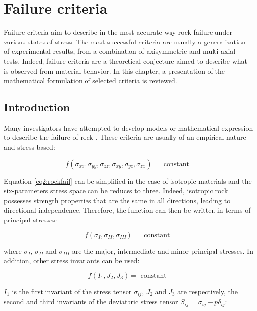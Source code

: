 \chapter{Failure criteria}\label{ch2:title}

Failure criteria aim to describe in the most accurate way rock failure under various states of stress. The most successful criteria are usually a generalization of experimental results, from a combination of axisymmetric and multi-axial tests. Indeed, failure criteria are a theoretical conjecture aimed to describe what is observed from material behavior. In this chapter, a presentation of the mathematical formulation of selected criteria is reviewed.

\section{Introduction}\label{ch2:background}

Many investigators have attempted to develop models or mathematical expression to describe the failure of rock \cite{Labuz2018}. These criteria are usually of an empirical nature and stress based: 

\begin{equation}\label{eq2:rockfail}
    f\left(\sigma_{x x}, \sigma_{y y}, \sigma_{z z}, \sigma_{x y}, \sigma_{y z}, \sigma_{z x}\right)=\text { constant }
\end{equation}

Equation \ref{eq2:rockfail} can be simplified in the case of isotropic materials and the six-parameters stress space can be reduces to three. Indeed, isotropic rock possesses strength properties that are the same in all directions, leading to directional independence. Therefore, the function can then be written in terms of principal stresses: 

\begin{equation}\label{eq2:fsigconst}
    f\left(\sigma_{I}, \sigma_{II}, \sigma_{III} \right)=\text { constant }
\end{equation}

where $\sigma_{I}$, $\sigma_{II}$ and $\sigma_{III}$ are the major, intermediate and minor principal stresses. In addition, other stress invariants can be used:

\begin{equation}\label{eq2:fijjconst}
    f\left(I_{1}, J_{2}, J_{3} \right)=\text { constant }
\end{equation}

$I_{1}$ is the first invariant of the stress tensor $\sigma_{ij}$, $J_{2}$ and $J_{3}$ are respectively, the second and third invariants of the deviatoric stress tensor $S_{ij}=\sigma_{ij}-p\delta_{ij}$: 

